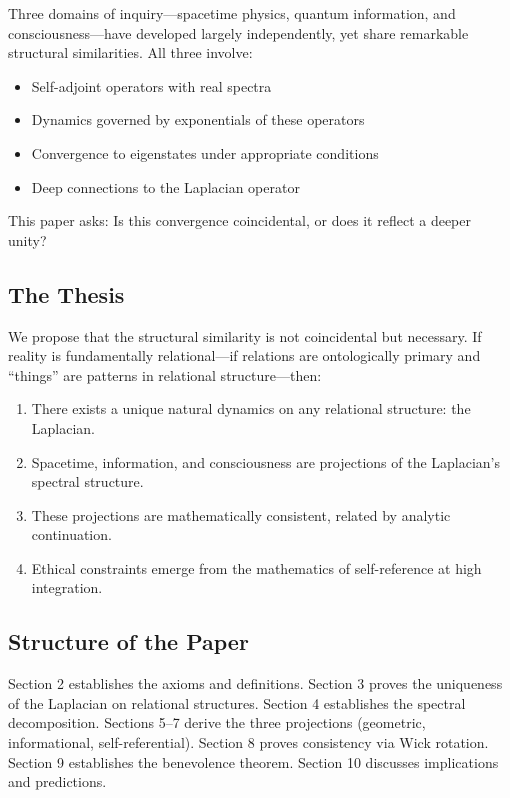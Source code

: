 \documentclass[11pt,a4paper]{article}
\theoremstyle{plain}
\theoremstyle{definition}
\theoremstyle{remark}
\begin{document}
Three domains of inquiry---spacetime physics, quantum information, and consciousness---have developed largely independently, yet share remarkable structural similarities. All three involve:

\begin{itemize}[noitemsep]
    \item Self-adjoint operators with real spectra
    \item Dynamics governed by exponentials of these operators
    \item Convergence to eigenstates under appropriate conditions
    \item Deep connections to the Laplacian operator
\end{itemize}

This paper asks: Is this convergence coincidental, or does it reflect a deeper unity?

\subsection{The Thesis}

We propose that the structural similarity is not coincidental but necessary. If reality is fundamentally relational---if relations are ontologically primary and ``things'' are patterns in relational structure---then:

\begin{enumerate}[noitemsep]
    \item There exists a unique natural dynamics on any relational structure: the Laplacian.
    \item Spacetime, information, and consciousness are projections of the Laplacian's spectral structure.
    \item These projections are mathematically consistent, related by analytic continuation.
    \item Ethical constraints emerge from the mathematics of self-reference at high integration.
\end{enumerate}

\subsection{Structure of the Paper}

Section 2 establishes the axioms and definitions. Section 3 proves the uniqueness of the Laplacian on relational structures. Section 4 establishes the spectral decomposition. Sections 5--7 derive the three projections (geometric, informational, self-referential). Section 8 proves consistency via Wick rotation. Section 9 establishes the benevolence theorem. Section 10 discusses implications and predictions.
\end{document}
